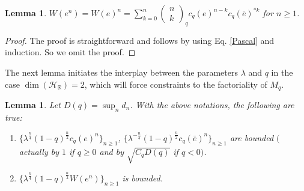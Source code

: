 \documentclass[12pt, a4paper,reqno]{amsart}
\newtheorem{Lemma}[Theorem]{Lemma}
\theoremstyle{definition}
\renewcommand{\geq}{\geqslant}
\def\R{\mathbb R}
\newcommand{\CH}{\mathcal{H}}
\begin{document}
\begin{Lemma}\label{wen}
$	W(e^n) = W(e)^n =\displaystyle \sum_{k=0}^{n}  \left( \begin{matrix} n\\ k \end{matrix}\right)_q c_q(e)^{n-k} c_q(\bar{e})^{* k}$ for $n\geq 1$.
\end{Lemma}

\begin{proof}
The proof is straightforward and follows by using Eq. \eqref{Pascal} and induction. So we omit the proof.  
\end{proof}

The next lemma initiates the interplay between the parameters $\lambda$ and $q$ in the case $\dim(\CH_\R)=2$, which will force constraints to the factoriality of $M_q$. 

\begin{Lemma}\label{bnd1}
Let $D(q)=\sup_n d_n$. With the above notations, the following are true:
\begin{enumerate}
\item[$(i)$] $\{\lambda^{\frac{n}{4}} (1-q)^{\frac{n}{2}} c_q(e)^n \}_{n\geq 1}$, $\{\lambda^{-\frac{n}{4}} (1-q)^{\frac{n}{2}} c_q(\bar e)^n\}_{n\geq 1} $ are bounded $($actually by $1$ if $q\geq 0$ and by $\sqrt{C_qD(q)}$ if $q<0)$.
\item[$(ii)$] $ \{\lambda^{\frac{n}{4}} (1-q)^{\frac{n}{2}} W(e^{ n} )\}_{n\geq 1} $ is bounded.
\end{enumerate}
\end{Lemma}	
\end{document}
